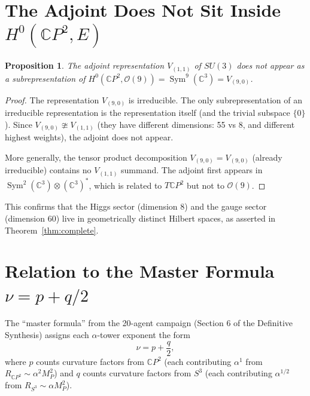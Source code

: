 \documentclass[11pt]{article}
\newtheorem{proposition}[theorem]{Proposition}
\theoremstyle{definition}
\theoremstyle{remark}
\newcommand{\CP}{\mathbb{C}P}
\newcommand{\Sym}{\operatorname{Sym}}
\newcommand{\Mp}{M_P}
\begin{document}
\section{The Adjoint Does Not Sit Inside $H^0(\CP^2, E)$}
\label{app:adjoint}

\begin{proposition}
The adjoint representation $V_{(1,1)}$ of $SU(3)$ does not appear as
a subrepresentation of $H^0(\CP^2, \mathcal{O}(9)) = \Sym^9(\mathbb{C}^3)
= V_{(9,0)}$.
\end{proposition}

\begin{proof}
The representation $V_{(9,0)}$ is irreducible. The only subrepresentation
of an irreducible representation is the representation itself (and the
trivial subspace $\{0\}$). Since $V_{(9,0)} \ncong V_{(1,1)}$ (they
have different dimensions: 55 vs 8, and different highest weights), the
adjoint does not appear.

More generally, the tensor product decomposition
$V_{(9,0)} = V_{(9,0)}$ (already irreducible) contains no $V_{(1,1)}$
summand. The adjoint first appears in $\Sym^2(\mathbb{C}^3) \otimes
(\mathbb{C}^3)^*$, which is related to $T\CP^2$ but not to
$\mathcal{O}(9)$.
\end{proof}

This confirms that the Higgs sector (dimension 8) and the gauge sector
(dimension 60) live in geometrically distinct Hilbert spaces, as
asserted in Theorem~\ref{thm:complete}.


\section{Relation to the Master Formula $\nu = p + q/2$}
\label{app:master}

The ``master formula'' from the 20-agent campaign (Section 6 of the
Definitive Synthesis) assigns each $\alpha$-tower exponent the form
\begin{equation}
\nu = p + \frac{q}{2},
\end{equation}
where $p$ counts curvature factors from $\CP^2$ (each contributing
$\alpha^1$ from $R_{\CP^2} \sim \alpha^2 \Mp^2$) and $q$ counts
curvature factors from $S^3$ (each contributing $\alpha^{1/2}$ from
$R_{S^3} \sim \alpha \Mp^2$).
\end{document}
